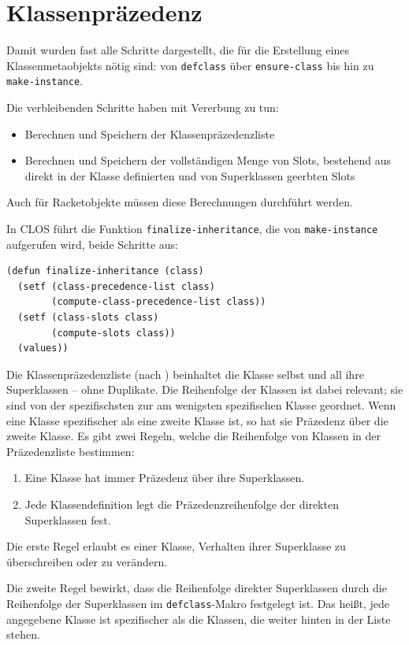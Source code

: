\section{Klassenpräzedenz}
\label{cpl}
Damit wurden fast alle Schritte dargestellt, die für die Erstellung eines Klassenmetaobjekts nötig sind: von \texttt{defclass} über \texttt{ensure-class} bis hin zu \texttt{make-instance}. 

Die verbleibenden Schritte haben mit Vererbung zu tun:
\begin{itemize}
 \item Berechnen und Speichern der Klassenpräzedenzliste
 \item Berechnen und Speichern der vollständigen Menge von Slots, bestehend aus direkt in der Klasse definierten und von Superklassen geerbten Slots
\end{itemize}

Auch für Racketobjekte müssen diese Berechnungen durchführt werden.

In CLOS führt die Funktion \texttt{finalize-inheritance}, die von \texttt{make-instance} aufgerufen wird, beide Schritte aus:

\begin{lstlisting}
(defun finalize-inheritance (class)
  (setf (class-precedence-list class)
        (compute-class-precedence-list class))
  (setf (class-slots class)
        (compute-slots class))
  (values))
\end{lstlisting}

Die Klassenpräzedenzliste (nach \cite[S. 118ff]{keene}) beinhaltet die Klasse selbst und all ihre Superklassen -- ohne Duplikate. Die Reihenfolge der Klassen ist dabei relevant; sie sind von der spezifischsten zur am wenigsten spezifischen Klasse geordnet. Wenn eine Klasse spezifischer als eine zweite Klasse ist, so hat sie Präzedenz über die zweite Klasse. Es gibt zwei Regeln, welche die Reihenfolge von Klassen in der Präzedenzliste bestimmen:

\begin{enumerate}
 \item Eine Klasse hat immer Präzedenz über ihre Superklassen.
 \item Jede Klassendefinition legt die Präzedenzreihenfolge der direkten Superklassen fest.
\end{enumerate}

Die erste Regel erlaubt es einer Klasse, Verhalten ihrer Superklasse zu überschreiben oder zu verändern.

Die zweite Regel bewirkt, dass die Reihenfolge direkter Superklassen durch die Reihenfolge der Superklassen im \texttt{defclass}-Makro festgelegt ist. Das heißt, jede angegebene Klasse ist spezifischer als die Klassen, die weiter hinten in der Liste stehen.

